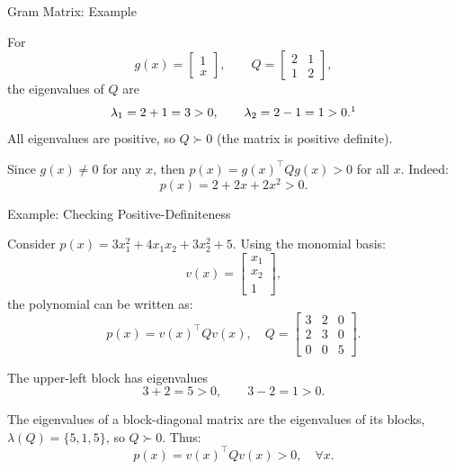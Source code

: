 \documentclass{beamer}
\begin{document}
\begin{frame}{Gram Matrix: Example}
	\begin{flushleft}
		
		For
		\[
		g(x)=
		\begin{bmatrix}
			1\\x
		\end{bmatrix},
		\qquad
		Q=
		\begin{bmatrix}
			2&1\\
			1&2
		\end{bmatrix},
		\]
		the eigenvalues of $Q$ are
		\[
		\lambda_1=2+1=3>0,
		\qquad
		\lambda_2=2-1=1>0.\footnotemark
		\]
		All eigenvalues are positive, so $Q\succ0$ (the matrix is positive definite).

		
		\bigskip
		
		Since $g(x)\neq0$ for any $x$, then $p(x)=g(x)^\top Qg(x)>0$ for all $x$. Indeed:
		\[
		p(x)=2+2x+2x^2>0.
		\]
		
		
			
	\end{flushleft}
\end{frame}


\begin{frame}{Example: Checking Positive-Definiteness}
	\begin{flushleft}
		Consider $p(x)=3x_1^2+4x_1x_2+3x_2^2+5$. Using the monomial basis:
		\[
		v(x)=
		\begin{bmatrix}
			x_1\\x_2\\1
		\end{bmatrix},
		\]
		the polynomial can be written as:
		\[
		p(x)=v(x)^\top Qv(x), \quad 
		Q=
		\begin{bmatrix}
			3&2&0\\
			2&3&0\\
			0&0&5
		\end{bmatrix}.
		\]
		
		The upper-left block has eigenvalues
		\[
		3+2=5>0,
		\qquad
		3-2=1>0.
		\]
		
		The eigenvalues of a block-diagonal matrix are the eigenvalues
		of its blocks, $\lambda(Q)=\{5,1,5\}$, so $Q \succ 0$. Thus:
		\[
		p(x)=v(x)^\top Qv(x)>0, \quad \forall x.
		\]
		
	\end{flushleft}
\end{frame}
\end{document}
